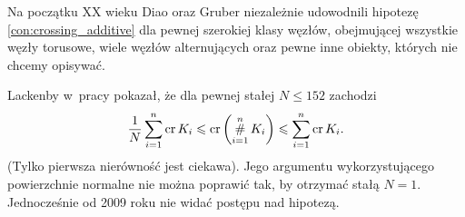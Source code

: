 Na początku XX wieku Diao \cite{diao2004} oraz Gruber \cite{gruber2003} niezależnie udowodnili hipotezę \ref{con:crossing_additive} dla pewnej szerokiej klasy węzłów, obejmującej wszystkie węzły torusowe, wiele węzłów alternujących oraz pewne inne obiekty, których nie chcemy opisywać.
%
%
%

Lackenby w~pracy \cite{lackenby2009} pokazał, że dla pewnej stałej $N \le 152$ zachodzi
\begin{equation}
    \frac 1 N \sum_{i=1}^n \operatorname{cr}{K_i} \leqslant \operatorname{cr} \left(\operatorname*{\#}_{i=1}^n K_i\right) \leqslant \sum_{i=1}^n \operatorname{cr}{K_i}.
\end{equation}
(Tylko pierwsza nierówność jest ciekawa).
Jego argumentu wykorzystującego powierzchnie normalne nie można poprawić tak, by otrzymać stałą $N = 1$.
Jednocześnie od 2009 roku nie widać postępu nad hipotezą.

%


